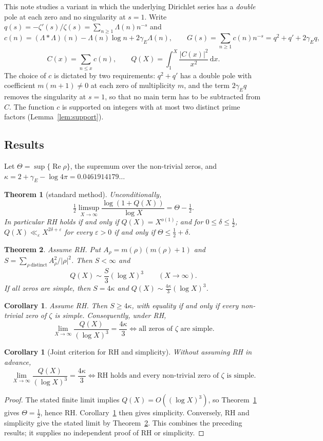 \documentclass[11pt]{amsart}
\newtheorem{theorem}{Theorem}
\newtheorem{corollary}[lemma]{Corollary}
\theoremstyle{remark}
\theoremstyle{definition}
\newcommand{\Lam}{\Lambda}
\newcommand{\gE}{\gamma_E}
\newcommand{\dd}{\,\mathrm{d}}
\renewcommand{\Re}{\operatorname{Re}}
\begin{document}
This note studies a variant in which the underlying Dirichlet series has a \emph{double} pole at each zero and no singularity at $s=1$. Write $q(s)=-\zeta'(s)/\zeta(s)=\sum_{n\ge1}\Lam(n)n^{-s}$ and
\[
c(n)=(\Lam*\Lam)(n)-\Lam(n)\log n+2\gE\Lam(n),\qquad G(s)=\sum_{n\ge1}c(n)n^{-s}=q^2+q'+2\gE q,
\]
\[
C(x)=\sum_{n\le x}c(n),\qquad Q(X)=\int_1^X\frac{|C(x)|^2}{x^2}\dd x .
\]
The choice of $c$ is dictated by two requirements: $q^2+q'$ has a double pole with coefficient $m(m+1)\neq0$ at each zero of multiplicity $m$, and the term $2\gE q$ removes the singularity at $s=1$, so that no main term has to be subtracted from $C$. The function $c$ is supported on integers with at most two distinct prime factors (Lemma~\ref{lem:support}).

\subsection*{Results} Let $\Theta=\sup\{\Re\rho\}$, the supremum over the non-trivial zeros, and $\kappa=2+\gE-\log4\pi=0.0461914179\ldots$

\begin{theorem}[standard method]\label{thm:A}
Unconditionally,
\[
\tfrac12\limsup_{X\to\infty}\frac{\log(1+Q(X))}{\log X}=\Theta-\tfrac12 .
\]
In particular RH holds if and only if $Q(X)=X^{o(1)}$; and for $0\le\delta\le\tfrac12$, $Q(X)\ll_\varepsilon X^{2\delta+\varepsilon}$ for every $\varepsilon>0$ if and only if $\Theta\le\tfrac12+\delta$.
\end{theorem}

\begin{theorem}\label{thm:B}
Assume RH. Put $A_\rho=m(\rho)(m(\rho)+1)$ and $S=\sum_{\rho\ \mathrm{distinct}}A_\rho^2/|\rho|^2$. Then $S<\infty$ and
\[
Q(X)\sim\frac S3(\log X)^3\qquad(X\to\infty).
\]
If all zeros are simple, then $S=4\kappa$ and $Q(X)\sim\frac{4\kappa}{3}(\log X)^3$.
\end{theorem}

\begin{corollary}\label{cor:Bprime}
Assume RH. Then $S\ge4\kappa$, with equality if and only if every non-trivial zero of $\zeta$ is simple. Consequently, under RH,
\[
\lim_{X\to\infty}\frac{Q(X)}{(\log X)^3}=\frac{4\kappa}{3}\iff\text{all zeros of }\zeta\text{ are simple.}
\]
\end{corollary}

\begin{corollary}[Joint criterion for RH and simplicity]\label{cor:joint}
Without assuming RH in advance,
\[
\lim_{X\to\infty}\frac{Q(X)}{(\log X)^3}=\frac{4\kappa}{3}
\iff \text{RH holds and every non-trivial zero of }\zeta\text{ is simple.}
\]
\end{corollary}
\begin{proof}
The stated finite limit implies $Q(X)=O((\log X)^3)$, so Theorem~\ref{thm:A} gives $\Theta=\frac12$, hence RH. Corollary~\ref{cor:Bprime} then gives simplicity. Conversely, RH and simplicity give the stated limit by Theorem~\ref{thm:B}. This combines the preceding results; it supplies no independent proof of RH or simplicity.
\end{proof}
\end{document}
